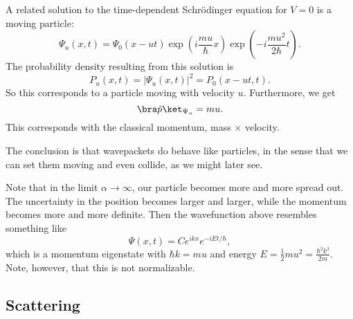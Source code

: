 \documentclass[a4paper]{article}
\begin{document}
A related solution to the time-dependent Schr\"odinger equation for $V = 0$ is a moving particle:
\[
  \Psi_u(x, t) = \Psi_0(x - ut) \exp\left(i\frac{mu}{\hbar} x\right) \exp\left(-i \frac{mu^2}{2\hbar}t\right).
\]
The probability density resulting from this solution is
\[
  P_u(x, t) = |\Psi_u(x, t)|^2 = P_0(x - ut, t).
\]
So this corresponds to a particle moving with velocity $u$. Furthermore, we get
\[
  \bra \hat{p}\ket_{\Psi_u} = mu.
\]
This corresponds with the classical momentum, mass $\times$ velocity.

The conclusion is that wavepackets do behave like particles, in the sense that we can set them moving and even collide, as we might later see.

Note that in the limit $\alpha \to \infty$, our particle becomes more and more spread out. The uncertainty in the position becomes larger and larger, while the momentum becomes more and more definite. Then the wavefunction above resembles something like
\[
  \Psi(x, t) = Ce^{ikx}e^{-iEt/\hbar},
\]
which is a momentum eigenstate with $\hbar k = mu$ and energy $E = \frac{1}{2}mu^2 = \frac{\hbar^2 k^2}{2m}$. Note, however, that this is not normalizable.

\subsection{Scattering}
\end{document}
